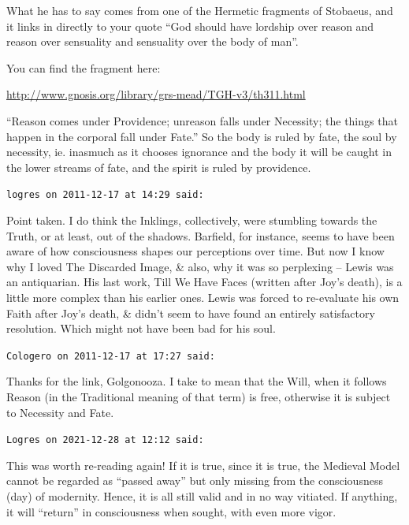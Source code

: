 \begin{footnotesize}
\begin{sffamily}
What he has to say comes from one of the Hermetic fragments of Stobaeus, and it links in directly to your quote ``God should have lordship over reason and reason over sensuality and sensuality over the body of man''.

You can find the fragment here:

\url{http://www.gnosis.org/library/grs-mead/TGH-v3/th311.html}

``Reason comes under Providence; unreason falls under Necessity; the things that happen in the corporal fall under Fate.'' So the body is ruled by fate, the soul by necessity, ie. inasmuch as it chooses ignorance and the body it will be caught in the lower streams of fate, and the spirit is ruled by providence.

\hfill

\texttt{logres on 2011-12-17 at 14:29 said:}

Point taken. I do think the Inklings, collectively, were stumbling towards the Truth, or at least, out of the shadows. Barfield, for instance, seems to have been aware of how consciousness shapes our perceptions over time. But now I know why I loved The Discarded Image, \& also, why it was so perplexing -- Lewis was an antiquarian. His last work, Till We Have Faces (written after Joy's death), is a little more complex than his earlier ones. Lewis was forced to re-evaluate his own Faith after Joy's death, \& didn't seem to have found an entirely satisfactory resolution. Which might not have been bad for his soul.

\hfill

\texttt{Cologero on 2011-12-17 at 17:27 said:}

Thanks for the link, Golgonooza. I take to mean that the Will, when it follows Reason (in the Traditional meaning of that term) is free, otherwise it is subject to Necessity and Fate.

\hfill

\texttt{Logres on 2021-12-28 at 12:12 said:}

This was worth re-reading again! If it is true, since it is true, the Medieval Model cannot be regarded as ``passed away'' but only missing from the consciousness (day) of modernity. Hence, it is all still valid and in no way vitiated. If anything, it will ``return'' in consciousness when sought, with even more vigor.


\hfill

\end{sffamily}
\end{footnotesize}

